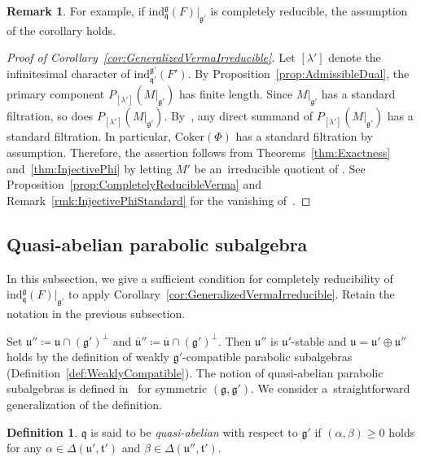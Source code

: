 \documentclass[11pt]{article}
\numberwithin{equation}{section}
\numberwithin{equation}{section}
\theoremstyle{definition}
\newtheorem{Definition}[Theorem]{Definition}
\newtheorem{Remark}[Theorem]{Remark}
\newcommand{\Coker}{\mathrm{Coker}}
\newcommand{\lieC}[1]{\mathfrak{#1}}
\newcommand{\lie}[1]{\mathfrak{#1}}
\newcommand{\ind}[2]{\mathrm{ind}^{\lieC{#1}}_{\lieC{#2}}}
\newcommand{\zuck}[2]{\Gamma^{#1}_{#2}}
\newcommand{\Dzuck}[3]{R^{#3}\zuck{#1}{#2}}
\newcommand{\fdual}[1]{{#1}^{d}}
\begin{document}
\begin{Remark}
	For example, if $\ind{g}{q}(F)|_{\lie{g'}}$ is completely reducible, the assumption of the corollary holds.
\end{Remark}

\begin{proof}[Proof of Corollary~\ref{cor:GeneralizedVermaIrreducible}]
	Let $[\lambda']$ denote the infinitesimal character of $\ind{g'}{q'}(F')$.
	By Proposition~\ref{prop:AdmissibleDual}, the primary component $P_{[\lambda']}(M|_{\lie{g'}})$ has finite length.
	Since $M|_{\lie{g'}}$ has a standard filtration, so does $P_{[\lambda']}(M|_{\lie{g'}})$.
	By~\cite[Proposition~3.7 and Theorem~9.8\,(3)]{Hu08_category_o}, any direct summand of $P_{[\lambda']}(M|_{\lie{g'}})$ has a standard filtration.
	In particular, $\Coker(\Phi)$ has a standard filtration by assumption.
	Therefore, the assertion follows from Theorems~\ref{thm:Exactness} and~\ref{thm:InjectivePhi} by letting $M'$ be an~irreducible quotient of \smash{$\ind{g'}{q'}\bigl(\fdual{F'}\bigr)$}.
	See Proposition~\ref{prop:CompletelyReducibleVerma} and Remark~\ref{rmk:InjectivePhiStandard} for the vanishing of~\smash{$\Dzuck{\Delta(G')}{\Delta(L')}{S - 1}(M'\otimes \Coker(\Phi))^{\Delta(G')}$}.
\end{proof}

\subsection{Quasi-abelian parabolic subalgebra}

In this subsection, we give a sufficient condition for completely reducibility of $\ind{g}{q}(F)|_{\lie{g'}}$
to apply Corollary~\ref{cor:GeneralizedVermaIrreducible}.
Retain the notation in the previous subsection.

Set $\lie{u}''\coloneq \lie{u} \cap (\lie{g}')^\perp$ and $\lie{\overline{u}}''\coloneq \lie{\overline{u}} \cap (\lie{g}')^\perp$.
Then $\lie{u}''$ is $\lie{u}'$-stable and $\lie{u} = \lie{u}' \oplus \lie{u}''$ holds by the definition of weakly $\lie{g'}$-compatible parabolic subalgebras (Definition~\ref{def:WeaklyCompatible}).
The notion of quasi-abelian parabolic subalgebras is defined in~\cite[p.~109]{EnPaWaWo85} for symmetric $(\lie{g}, \lie{g'})$.
We consider a~straightforward generalization of the definition.

\begin{Definition}\label{def:QuasiAbelian}
	$\lie{q}$ is said to be \emph{quasi-abelian} with respect to $\lie{g'}$ if
	$(\alpha, \beta)\geq 0$ holds for any $\alpha \in \Delta(\lie{u'}, \lie{t'})$ and $\beta \in \Delta(\lie{u''}, \lie{t'})$.
\end{Definition}
\end{document}
